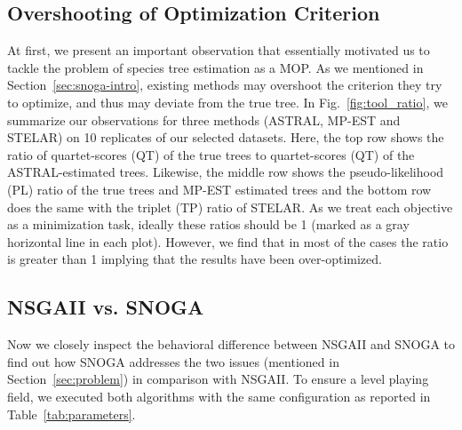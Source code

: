 \subsection{Overshooting of Optimization Criterion}
\label{subsec:observation}
At first, we present an important observation that essentially motivated us to tackle the problem of species tree estimation as a MOP. As we mentioned in Section~\ref{sec:snoga-intro}, existing methods may overshoot the criterion they try to optimize, and thus may deviate from the true tree. In Fig.~\ref{fig:tool_ratio}, we summarize our observations for three methods (ASTRAL, MP-EST and STELAR) on 10 replicates of our selected datasets. Here, the top row shows the ratio of quartet-scores (QT) of the true trees to quartet-scores (QT) of the ASTRAL-estimated trees. Likewise, the middle row shows the pseudo-likelihood (PL) ratio of the true trees and MP-EST estimated trees and the bottom row does the same with the triplet (TP) ratio of STELAR. As we treat each objective as a minimization task, ideally these ratios should be 1 (marked as a gray horizontal line in each plot). However, we find that in most of the cases the ratio is greater than 1 implying that the results have been over-optimized. 


\subsection{NSGAII vs. SNOGA}
Now we closely inspect the behavioral difference between NSGAII and SNOGA to find out how SNOGA addresses the two issues (mentioned in Section~\ref{sec:problem}) in comparison with NSGAII. To ensure a level playing field, we executed both algorithms with the same configuration as reported in Table~\ref{tab:parameters}. 

